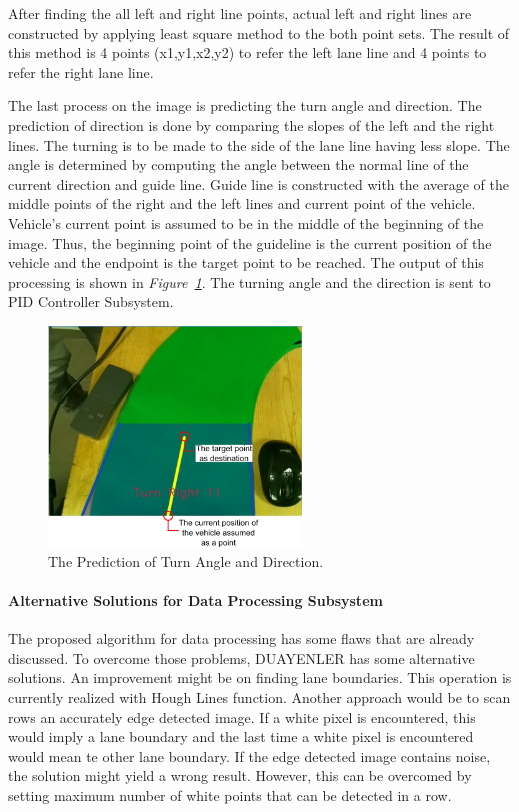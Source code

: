 \documentclass[a4paper,12pt]{article}
\begin{document}
	After finding the all left and right line points, actual left and right lines are constructed by applying least square method to the both point sets. The result of this method is 4 points (x1,y1,x2,y2) to refer the left lane line and 4 points to refer the right lane line.
	
	The last process on the image is predicting the turn angle and direction. The prediction of direction is done by comparing the slopes of the left and the right lines. The turning is to be made to the side of the lane line having less slope. The angle is determined by computing the angle between the normal line of the current direction and guide line. Guide line is constructed with the average of the middle points of the right and the left lines and current point of the vehicle. Vehicle's current point is assumed to be in the middle of the beginning of the image. Thus, the beginning point of the guideline is the current position of the vehicle and the endpoint is the target point to be reached. The output of this processing is shown in \textit{Figure~\ref{fig:turn-prediction-explained}}. The turning angle and the direction is sent to PID Controller Subsystem.
	
	\begin{figure}[H]
		\center
		\setlength{\unitlength}{\textwidth} 
		\includegraphics[width=0.6\textwidth]{images/turn-prediction-explained}
		\caption{\label{fig:turn-prediction-explained}The Prediction of Turn Angle and Direction.}
	\end{figure}
	\paragraph{Alternative Solutions for Data Processing Subsystem}
		The proposed algorithm for data processing has some flaws that are already discussed. To overcome those problems, DUAYENLER has some alternative solutions. An improvement might be on finding lane boundaries. This operation is currently realized with Hough Lines function. Another approach would be to scan rows an accurately edge detected image. If a white pixel is encountered, this would imply a lane boundary and the last time a white pixel is encountered would mean te other lane boundary. If the edge detected image contains noise, the solution might yield a wrong result. However, this can be overcomed by setting maximum number of white points that can be detected in a row.
		
\end{document}
